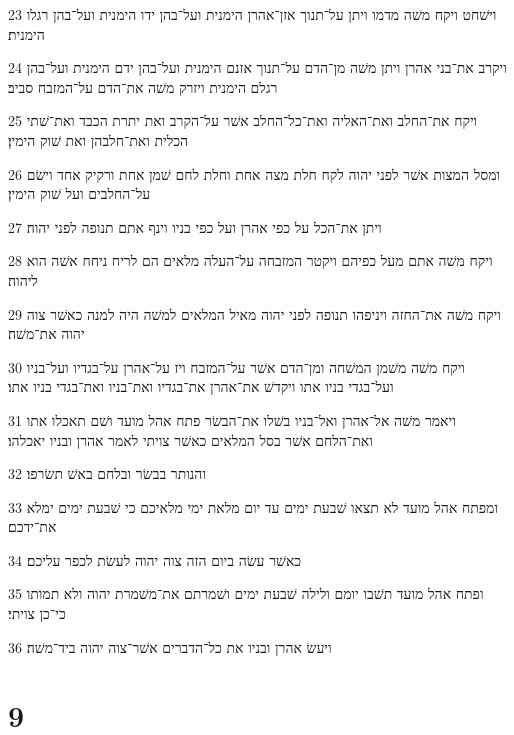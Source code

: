 \par 23 וישׁחט ויקח משׁה מדמו ויתן על־תנוך אזן־אהרן הימנית ועל־בהן ידו הימנית ועל־בהן רגלו הימנית׃
\par 24 ויקרב את־בני אהרן ויתן משׁה מן־הדם על־תנוך אזנם הימנית ועל־בהן ידם הימנית ועל־בהן רגלם הימנית ויזרק משׁה את־הדם על־המזבח סביב׃
\par 25 ויקח את־החלב ואת־האליה ואת־כל־החלב אשׁר על־הקרב ואת יתרת הכבד ואת־שׁתי הכלית ואת־חלבהן ואת שׁוק הימין׃
\par 26 ומסל המצות אשׁר לפני יהוה לקח חלת מצה אחת וחלת לחם שׁמן אחת ורקיק אחד וישׂם על־החלבים ועל שׁוק הימין׃
\par 27 ויתן את־הכל על כפי אהרן ועל כפי בניו וינף אתם תנופה לפני יהוה׃
\par 28 ויקח משׁה אתם מעל כפיהם ויקטר המזבחה על־העלה מלאים הם לריח ניחח אשׁה הוא ליהוה׃
\par 29 ויקח משׁה את־החזה ויניפהו תנופה לפני יהוה מאיל המלאים למשׁה היה למנה כאשׁר צוה יהוה את־משׁה׃
\par 30 ויקח משׁה משׁמן המשׁחה ומן־הדם אשׁר על־המזבח ויז על־אהרן על־בגדיו ועל־בניו ועל־בגדי בניו אתו ויקדשׁ את־אהרן את־בגדיו ואת־בניו ואת־בגדי בניו אתו׃
\par 31 ויאמר משׁה אל־אהרן ואל־בניו בשׁלו את־הבשׂר פתח אהל מועד ושׁם תאכלו אתו ואת־הלחם אשׁר בסל המלאים כאשׁר צויתי לאמר אהרן ובניו יאכלהו׃
\par 32 והנותר בבשׂר ובלחם באשׁ תשׂרפו׃
\par 33 ומפתח אהל מועד לא תצאו שׁבעת ימים עד יום מלאת ימי מלאיכם כי שׁבעת ימים ימלא את־ידכם׃
\par 34 כאשׁר עשׂה ביום הזה צוה יהוה לעשׂת לכפר עליכם׃
\par 35 ופתח אהל מועד תשׁבו יומם ולילה שׁבעת ימים ושׁמרתם את־משׁמרת יהוה ולא תמותו כי־כן צויתי׃
\par 36 ויעשׂ אהרן ובניו את כל־הדברים אשׁר־צוה יהוה ביד־משׁה׃

\chapter{9}

